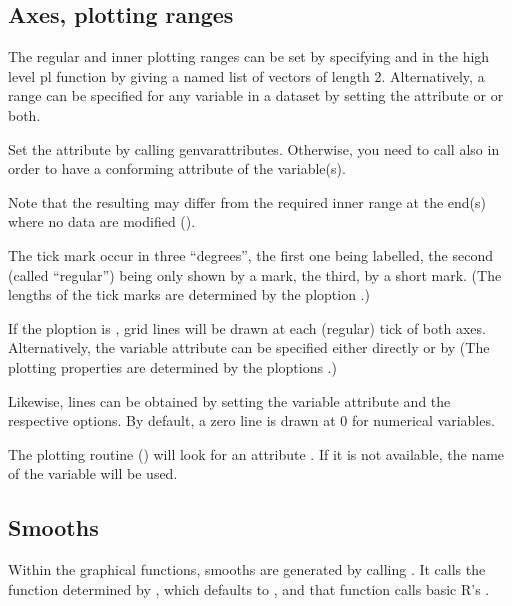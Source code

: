 \documentclass[11pt]{article}\usepackage[]{graphicx}\usepackage[]{color}
\begin{document}
\subsection{Axes, plotting ranges}

The regular and inner plotting ranges can be set by specifying
 and  in the high level pl function 
by giving a named list of vectors of length 2.
Alternatively, a range can be specified for any variable in a dataset
by setting the attribute  or
 or both.

Set the  attribute by calling genvarattributes. 
Otherwise, you need to call also  in order to have a conforming
 attribute of the variable(s).

Note that the resulting  may differ from the required 
inner range at the end(s) where no data are modified ().

The tick mark occur in three ``degrees'', the first one being labelled,
the second (called ``regular'') being only shown by a mark, the third, 
by a short mark.
(The lengths of the tick marks are determined by the ploption .)

If the ploption  is , grid lines will be drawn at each (regular)
tick of both axes. 
Alternatively, the variable attribute  can be specified either 
directly or by 
(The plotting properties  are determined by the ploptions
.)

Likewise, lines can be obtained by setting the variable attribute 
and the respective options. By default, a zero line is drawn at 0 for
numerical variables.

The plotting routine () will look for an attribute .
If it is not available, the name of the variable will be used.

\subsection{Smooths}

Within the graphical functions, smooths are generated by calling 
. It calls the function determined by
, which defaults to , and that
function calls basic R's .
\end{document}
